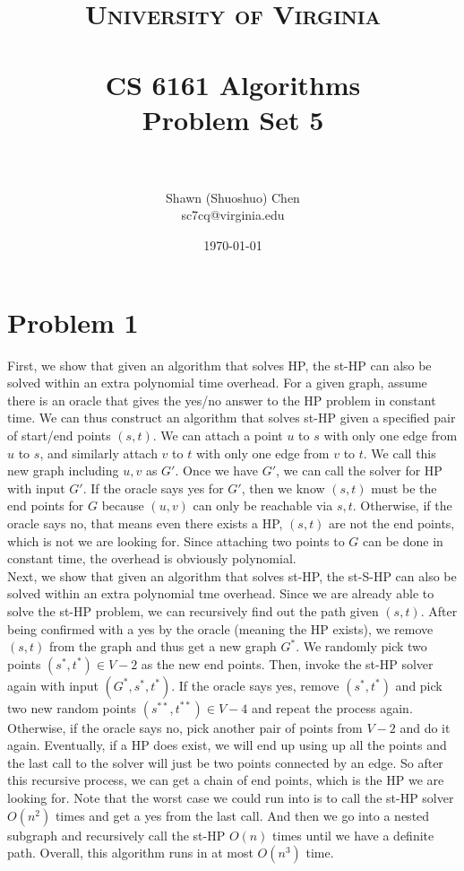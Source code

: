 \documentclass[titlepage, paper=a4, fontsize=11pt]{scrartcl} %
\title{	
\normalfont \normalsize 
\textsc{University of Virginia} \\ [25pt] %
\horrule{0.5pt} \\[0.4cm] %
\huge CS 6161 Algorithms \\
\huge Problem Set 5 \\ %
\horrule{2pt} \\[0.5cm] %
}
\author{Shawn (Shuoshuo) Chen\\sc7cq@virginia.edu} %
\date{\normalsize\today} %
\numberwithin{equation}{section} %
\numberwithin{figure}{section} %
\numberwithin{table}{section} %
\begin{document}
\maketitle %


\section*{Problem 1}
First, we show that given an algorithm that solves HP, the st-HP can also be solved within an extra polynomial time overhead. For a given graph, assume there is an oracle that gives the yes/no answer to the HP problem in constant time. We can thus construct an algorithm that solves st-HP given a specified pair of start/end points $(s,t)$. We can attach a point $u$ to $s$ with only one edge from $u$ to $s$, and similarly attach $v$ to $t$ with only one edge from $v$ to $t$. We call this new graph including $u,v$ as $G'$. Once we have $G'$, we can call the solver for HP with input $G'$. If the oracle says yes for $G'$, then we know $(s,t)$ must be the end points for $G$ because $(u,v)$ can only be reachable via $s,t$. Otherwise, if the oracle says no, that means even there exists a HP, $(s,t)$ are not the end points, which is not we are looking for. Since attaching two points to $G$ can be done in constant time, the overhead is obviously polynomial. \\

Next, we show that given an algorithm that solves st-HP, the st-S-HP can also be solved within an extra polynomial tme overhead. Since we are already able to solve the st-HP problem, we can recursively find out the path given $(s,t)$. After being confirmed with a yes by the oracle (meaning the HP exists), we remove $(s,t)$ from the graph and thus get a new graph $G^*$. We randomly pick two points $(s^*,t^*) \in V-2$ as the new end points. Then, invoke the st-HP solver again with input $(G^*,s^*,t^*)$. If the oracle says yes, remove $(s^*,t^*)$ and pick two new random points $(s^{**},t^{**}) \in V-4$ and repeat the process again. Otherwise, if the oracle says no, pick another pair of points from $V-2$ and do it again. Eventually, if a HP does exist, we will end up using up all the points and the last call to the solver will just be two points connected by an edge. So after this recursive process, we can get a chain of end points, which is the HP we are looking for. Note that the worst case we could run into is to call the st-HP solver $O(n^2)$ times and get a yes from the last call. And then we go into a nested subgraph and recursively call the st-HP $O(n)$ times until we have a definite path. Overall, this algorithm runs in at most $O(n^3)$ time. \\
\end{document}
